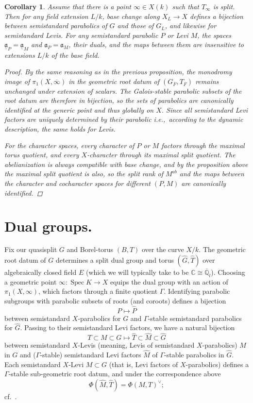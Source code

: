 \documentclass[openany]{amsbook}
\newtheorem{corollary}[theorem]{Corollary}
\theoremstyle{definition}
\theoremstyle{remark}
\numberwithin{equation}{section}
\newcommand{\Q}{\mathbb{Q}}
\newcommand{\C}{\mathbb{C}}
\newcommand{\ol}[1]{\overline{#1}}
\newcommand{\ul}[1]{\underline{#1}}
\renewcommand{\-}{\operatorname{-}}
\newcommand{\Spec}{\operatorname{Spec}}
\renewcommand{\a}{\mathfrak{a}}
\begin{document}
\begin{corollary}\label{cor.parab.levi.scalar.extensions}
    Assume that there is a point $\infty \in X(k)$ such that $T_\infty$ is split. Then for any field extension $L/k$, base change along $X_L \to X$ defines a bijection between semistandard parabolics of $G$ and those of $G_{L}$, and likewise for semistandard Levis. For any semistandard parabolic $P$ or Levi $M$, the spaces $\ul{\a}_{P} = \ul{\a}_M$ and $\a_P = \a_M$, their duals, and the maps between them are insensitive to extensions $L/k$ of the base field.
    \begin{proof}
        By the same reasoning as in the previous proposition, the monodromy image of $\pi_1(X, \ol{\infty})$ in the geometric root datum of $(G_{\ol{F}}, T_{\ol{F}})$ remains unchanged under extension of scalars. The Galois-stable parabolic subsets of the root datum are therefore in bijection, so the sets of parabolics are canonically identified at the generic point and thus globally on $X$. Since all semistandard Levi factors are uniquely determined by their parabolic i.e.,\ according to the dynamic description, the same holds for Levis.
    
        For the character spaces, every character of $P$ or $M$ factors through the maximal torus quotient, and every $X$-character through its maximal split quotient. The abelianization is always compatible with base change, and by the proposition above the maximal split quotient is also, so the split rank of $M^{ab}$ and the maps between the character and cocharacter spaces for different $(P,M)$ are canonically identified.
    \end{proof}
\end{corollary}

\section{Dual groups.}\label{subsect.dual.gps}
Fix our quasisplit $G$ and Borel-torus $(B,T)$ over the curve $X/k$. The geometric root datum of $G$ determines a split dual group and torus $(\widehat{G}, \widehat{T})$ over algebraically closed field $E$ (which we will typically take to be $\C \cong \ol{\Q}_l$). Choosing a geometric point $\infty : \Spec K \to X$ equips the dual group with an action of $\pi_1(X, \infty)$, which factors through a finite quotient $\Gamma$. Identifying parabolic subgroups with parabolic subsets of roots (and coroots) defines a bijection
$$
    P \mapsto \widehat{P}
$$
between semistandard $X$-parabolics for $G$ and $\Gamma$-stable semistandard parabolics for $\widehat{G}$. Passing to their semistandard Levi factors, we have a natural bijection 
$$
    T \subset M \subset G \mapsto \widehat{T} \subset \widehat{M} \subset \widehat{G}
$$
between semistandard $X$-Levis (meaning, Levis of semistandard $X$-parabolics) $M$ in $G$ and ($\Gamma$-stable) semistandard Levi factors $\widehat{M}$ of $\Gamma$-stable parabolics in $\widehat{G}$. Each semistandard $X$-Levi $M \subset G$ (that is, Levi factors of $X$-parabolics) defines a $\Gamma$-stable sub-geometric root datum, and under the correspondence above 
$$
    \Phi(\widehat{M}, \widehat{T}) = \Phi(M, T)^\vee;
$$
cf.\ \cite[\S 1]{arthurtransferwoi}. 
\end{document}
